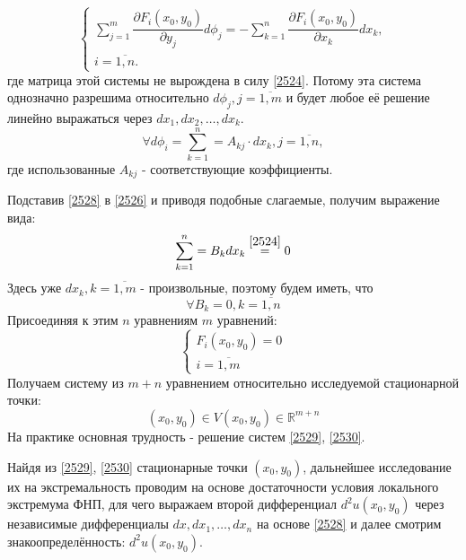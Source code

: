 \begin{equation*}
\begin{cases}
\sum\limits_{j=1}^m \dfrac{\partial F_i (x_0, y_0)}{\partial y_j} d \phi_j = - \sum\limits_{k=1}^n \dfrac{\partial F_i (x_0, y_0)}{\partial x_k} d x_k, \\
i = \overline{1, n}.
\end{cases}
\end{equation*}
где матрица этой системы не вырождена в силу \eqref{2524}. Потому эта система однозначно разрешима относительно $d \phi_j, j = \overline{1,m}$ и будет любое её решение линейно выражаться через $d x_1, d x_2, \ldots, d x_k$.
\begin{equation}
\label{2528}
\forall d \phi_i = \sum\limits_{k=1}^{n} = A_{kj} \cdot d x_k, j = \overline{1,n},
\end{equation}
где использованные $A_{kj}$ - соответствующие коэффициенты.

Подставив \eqref{2528} в \eqref{2526} и приводя подобные слагаемые, получим выражение вида:
\begin{equation*}
\sum\limits_{k=1}^{n} = B_k d x_k \overset{\eqref{2524}}{=} 0
\end{equation*}
Здесь уже $d x_k, k = \overline{1,m}$ - произвольные, поэтому будем иметь, что 
\begin{equation}
\label{2529}
\forall B_k = 0, k = \overline{1,n}
\end{equation}
Присоединяя к этим $n$ уравнениям $m$ уравнений:
\begin{equation}
\label{2530}
\begin{cases}
F_i (x_0, y_0) = 0 \\
i = \overline{1,m}
\end{cases}
\end{equation}
Получаем систему из $m+n$ уравнением относительно исследуемой стационарной точки:
\begin{equation*}
(x_0, y_0) \in V(x_0, y_0) \in \mathbb{R}^{m+n}
\end{equation*}
На практике основная трудность - решение систем \eqref{2529}, \eqref{2530}.

Найдя из \eqref{2529}, \eqref{2530} стационарные точки $(x_0, y_0)$, дальнейшее исследование их на экстремальность проводим на основе достаточности условия локального экстремума ФНП, для чего выражаем второй дифференциал $d^2 u (x_0, y_0)$ через независимые дифференциалы $dx, dx_1, \ldots, dx_n$ на основе \eqref{2528} и далее смотрим знакоопределённость: $d^2 u (x_0, y_0)$.

